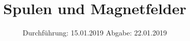 

\subject{V308}
\title{Spulen und Magnetfelder}
\date{%
  Durchführung: 15.01.2019
  \hspace{3em}
  Abgabe: 22.01.2019
}



\maketitle
\thispagestyle{empty}
\tableofcontents
\newpage







\printbibliography{}


